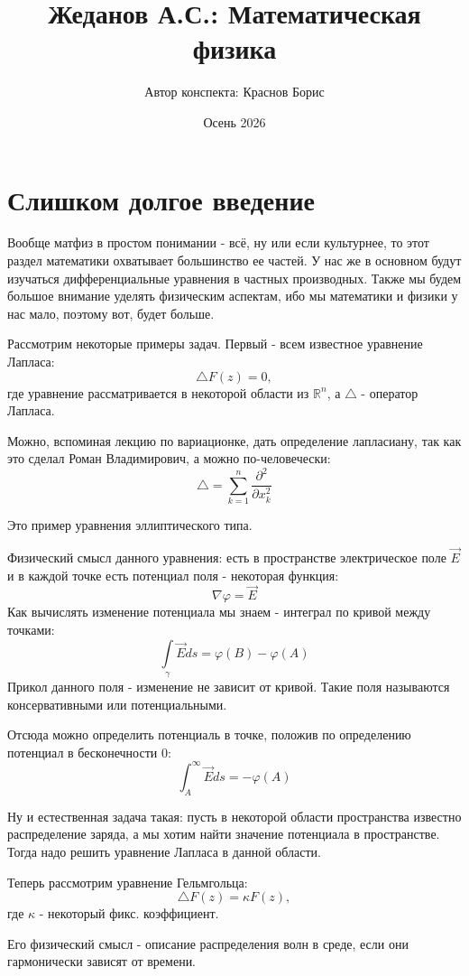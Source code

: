 \documentclass[12pt,a4paper]{article} %
\author{Автор конспекта: Краснов Борис} %
\title{Жеданов А.С.: Математическая физика} %
\date{Осень 2026} %
\newcommand{\R}{\mathbb{R}}
\begin{document}
	\maketitle
	\tableofcontents
	\clearpage
	
	\section{Слишком долгое введение}
	Вообще матфиз в простом понимании - всё, ну или если культурнее, то этот раздел математики охватывает большинство ее частей. У нас же в основном будут изучаться дифференциальные уравнения в частных производных. Также мы будем большое внимание уделять физическим аспектам, ибо мы математики и физики у нас мало, поэтому вот, будет больше.
	
	Рассмотрим некоторые примеры задач. Первый - всем известное уравнение Лапласа:
	$$\triangle F(z)=0,$$
	где уравнение рассматривается в некоторой области из $\R^n$, а $\triangle$ - оператор Лапласа.
	
	Можно, вспоминая лекцию по вариационке, дать определение лапласиану, так как это сделал Роман Владимирович, а можно по-человечески:
	$$\triangle=\sum_{k=1}^n\frac{\partial^2}{\partial x_k^2}$$
	
	Это пример уравнения эллиптического типа.
	
	Физический смысл данного уравнения: есть в пространстве электрическое поле $\overrightarrow{E}$ и в каждой точке есть потенциал поля - некоторая функция:
	$$\nabla\varphi=\overrightarrow{E}$$
	Как вычислять изменение потенциала мы знаем - интеграл по кривой между точками:
	$$\int\limits_{\gamma}\overrightarrow{E}ds=\varphi(B)-\varphi(A)$$
	Прикол данного поля - изменение не зависит от кривой. Такие поля называются консервативными или потенциальными.
	
	Отсюда можно определить потенциаль в точке, положив по определению потенциал в бесконечности 0:
	$$\int_A^{\infty}\overrightarrow{E}ds=-\varphi(A)$$
	
	Ну и естественная задача такая: пусть в некоторой области пространства известно распределение заряда, а мы хотим найти значение потенциала в пространстве. Тогда надо решить уравнение Лапласа в данной области.
	
	Теперь рассмотрим уравнение Гельмгольца:
	$$\triangle F(z)=\kappa F(z),$$
	где $\kappa$ - некоторый фикс. коэффициент.
	
	Его физический смысл - описание распределения волн в среде, если они гармонически зависят от времени.
	
\end{document}
